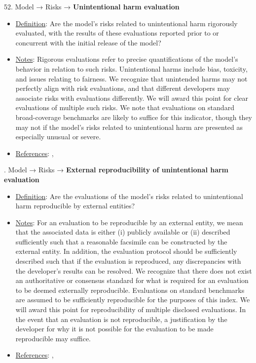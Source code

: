 52. Model → Risks → \textbf{Unintentional harm evaluation}
\vspace{-\parskip}
\begin{itemize}
	\item
	\underline{Definition}: Are the model’s risks related to unintentional harm rigorously evaluated, with the results of these evaluations reported prior to or concurrent with the initial release of the model?
	\item
	\underline{Notes}: Rigorous evaluations refer to precise quantifications of the model's behavior in relation to such risks. Unintentional harms include bias, toxicity, and issues relating to fairness. We recognize that unintended harms may not perfectly align with risk evaluations, and that different developers may associate risks with evaluations differently. We will award this point for clear evaluations of multiple such risks. We note that evaluations on standard broad-coverage benchmarks are likely to suffice for this indicator, though they may not if the model's risks related to unintentional harm are presented as especially unusual or severe.
	\item
	\underline{References}: \citet{solaiman2023evaluating}, \citet{weidinger2021ethical}
\end{itemize}


. Model → Risks → \textbf{External reproducibility of unintentional harm evaluation}
\vspace{-\parskip}
\begin{itemize}
	\item
	\underline{Definition}: Are the evaluations of the model’s risks related to unintentional harm reproducible by external entities?
	\item
	\underline{Notes}: For an evaluation to be reproducible by an external entity, we mean that the associated data is either (i) publicly available or (ii) described sufficiently such that a reasonable facsimile can be constructed by the external entity. In addition, the evaluation protocol should be sufficiently described such that if the evaluation is reproduced, any discrepancies with the developer's results can be resolved. We recognize that there does not exist an authoritative or consensus standard for what is required for an evaluation to be deemed externally reproducible. Evaluations on standard benchmarks are assumed to be sufficiently reproducible for the purposes of this index. We will award this point for reproducibility of multiple disclosed evaluations. In the event that an evaluation is not reproducible, a justification by the developer for why it is not possible for the evaluation to be made reproducible may suffice.
	\item
	\underline{References}: \citet{kapoor2023leakage}, \citet{weidinger2021ethical}
\end{itemize}


